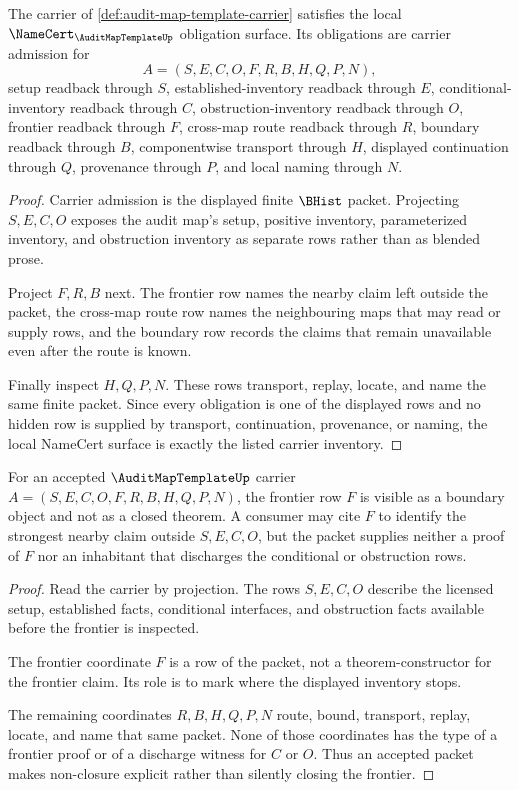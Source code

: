 \begin{theorem}
\label{thm:audit-map-template-namecert-obligations}
The carrier of \autoref{def:audit-map-template-carrier} satisfies the local $\NameCert_{\AuditMapTemplateUp}$ obligation surface. Its obligations are carrier admission for
$$
A=(S,E,C,O,F,R,B,H,Q,P,N),
$$
setup readback through $S$, established-inventory readback through $E$, conditional-inventory readback through $C$, obstruction-inventory readback through $O$, frontier readback through $F$, cross-map route readback through $R$, boundary readback through $B$, componentwise transport through $H$, displayed continuation through $Q$, provenance through $P$, and local naming through $N$.
\end{theorem}
\begin{proof}
Carrier admission is the displayed finite $\BHist$ packet. Projecting $S,E,C,O$ exposes the audit map's setup, positive inventory, parameterized inventory, and obstruction inventory as separate rows rather than as blended prose.

Project $F,R,B$ next. The frontier row names the nearby claim left outside the packet, the cross-map route row names the neighbouring maps that may read or supply rows, and the boundary row records the claims that remain unavailable even after the route is known.

Finally inspect $H,Q,P,N$. These rows transport, replay, locate, and name the same finite packet. Since every obligation is one of the displayed rows and no hidden row is supplied by transport, continuation, provenance, or naming, the local NameCert surface is exactly the listed carrier inventory.
\end{proof}

\begin{theorem}
\label{thm:audit-map-template-frontier-nonclosure}
For an accepted $\AuditMapTemplateUp$ carrier $A=(S,E,C,O,F,R,B,H,Q,P,N)$, the frontier row $F$ is visible as a boundary object and not as a closed theorem. A consumer may cite $F$ to identify the strongest nearby claim outside $S,E,C,O$, but the packet supplies neither a proof of $F$ nor an inhabitant that discharges the conditional or obstruction rows.
\end{theorem}
\begin{proof}
Read the carrier by projection. The rows $S,E,C,O$ describe the licensed setup, established facts, conditional interfaces, and obstruction facts available before the frontier is inspected.

The frontier coordinate $F$ is a row of the packet, not a theorem-constructor for the frontier claim. Its role is to mark where the displayed inventory stops.

The remaining coordinates $R,B,H,Q,P,N$ route, bound, transport, replay, locate, and name that same packet. None of those coordinates has the type of a frontier proof or of a discharge witness for $C$ or $O$. Thus an accepted packet makes non-closure explicit rather than silently closing the frontier.
\end{proof}


